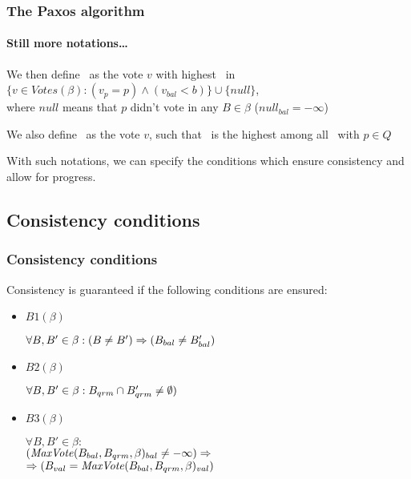 \documentclass{beamer}
\begin{document}
\begin{frame}
  \frametitle{The Paxos algorithm}
  \framesubtitle{Still more notations\ldots}

  We then define \maxvotep\ as the vote $v$ with highest \vbal\ in 
 $\{v \in Votes(\beta) : (v_p = p) \wedge (v_{bal} < b)\} \cup \{null\}$,\\
 where $null$ means that $p$ didn't vote in any $B \in \beta$ ($null_{bal} = -\infty$)

  \vspace{4 mm}
  We also define \maxvoteq\ as the vote $v$, such that \vbal\ is the highest among all \maxvotep\ with $p \in Q$

  \vspace{8 mm}
  {\small With such notations, we can specify the conditions which ensure consistency and allow for progress.}

\end{frame}

\subsection{Consistency conditions}


\begin{frame}
  \frametitle{Consistency conditions}

  Consistency is guaranteed if the following conditions are ensured:

  \begin{itemize}
    \item $B1(\beta)$
    
    $\forall B, B' \in \beta : (B \neq B') \Rightarrow (B_{bal} \neq B'_{bal})$

    \vspace{4 mm}
    \item $B2(\beta)$ %
  
    $\forall B, B' \in \beta : B_{qrm} \cap B'_{qrm} \neq \emptyset)$
    
    \vspace{4 mm}
    \item $B3(\beta)$
  
    $\forall B, B' \in \beta :$\\
    $(\text{\textit{MaxVote}}(B_{bal}, B_{qrm}, \beta)_{bal} \neq -\infty) \Rightarrow$\\
    $\Rightarrow (B_{val} = \text{\textit{MaxVote}}(B_{bal}, B_{qrm}, \beta)_{val})$
  \end{itemize}

\end{frame}
\end{document}
